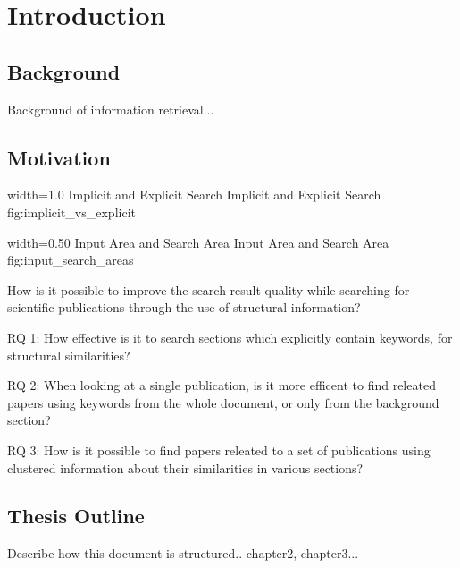 \chapter{Introduction}
\label{cha:introduction}

\section{Background}
\label{sec:background}

Background of information retrieval...

\section{Motivation}
\label{sec:Motivation}

      {width=1.0\textwidth}
      {Implicit and Explicit Search}
      {Implicit and Explicit Search}
      {fig:implicit_vs_explicit}

      {width=0.50\textwidth}
      {Input Area and Search Area}
      {Input Area and Search Area}
      {fig:input_search_areas}

How is it possible to improve the search result quality while searching for scientific publications through the use of structural information?

RQ 1: How effective is it to search sections which explicitly contain keywords, for structural similarities?

RQ 2: When looking at a single publication, is it more efficent to find releated papers using keywords from the whole document, or only from the background section?

RQ 3: How is it possible to find papers releated to a set of publications using clustered information about their similarities in various sections?

\section{Thesis Outline}
\label{sec:thesis_outline}

Describe how this document is structured.. chapter2, chapter3...
